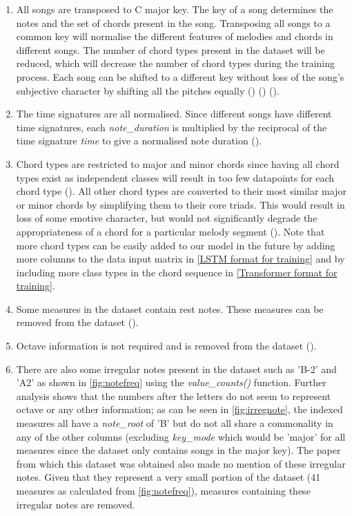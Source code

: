 \begin{enumerate}
  \item All songs are transposed to C major key. The key of a song determines the notes and the set of chords present in the song. Transposing all songs to a common key will normalise the different features of melodies and chords in different songs. The number of chord types present in the dataset will be reduced, which will decrease the number of chord types during the training process. Each song can be shifted to a different key without loss of the song's subjective character by shifting all the pitches equally (\cite{MySong}) (\cite{MLForChords}) (\cite{BLSTM}).
  \item The time signatures are all normalised. Since different songs have different time signatures, each \emph{note\_duration} is multiplied by the reciprocal of the time signature \emph{time} to give a normalised note duration (\cite{BLSTM}).
  \item Chord types are restricted to major and minor chords since having all chord types exist as independent classes will result in too few datapoints for each chord type (\cite{BLSTM}). All other chord types are converted to their most similar major or minor chords by simplifying them to their core triads. This would result in loss of some emotive character, but would not significantly degrade the appropriateness of a chord for a particular melody segment (\cite{MySong}). Note that more chord types can be easily added to our model in the future by adding more columns to the data input matrix in \cref{LSTM format for training} and by including more class types in the chord sequence in \cref{Transformer format for training}.
  \item Some measures in the dataset contain rest notes. These measures can be removed from the dataset (\cite{MLForChords}).
  \item Octave information is not required and is removed from the dataset (\cite{BLSTM}).
  \item There are also some irregular notes present in the dataset such as 'B-2' and 'A2' as shown in \cref{fig:notefreq} using the \emph{value\_counts()} function. Further analysis shows that the numbers after the letters do not seem to represent octave or any other information; as can be seen in \cref{fig:irregnote}, the indexed measures all have a \emph{note\_root} of 'B' but do not all share a commonality in any of the other columns (excluding \emph{key\_mode} which would be 'major' for all measures since the dataset only contains songs in the major key). The paper from which this dataset was obtained also made no mention of these irregular notes. Given that they represent a very small portion of the dataset (41 measures as calculated from \cref{fig:notefreq}), measures containing these irregular notes are removed.
\end{enumerate}

